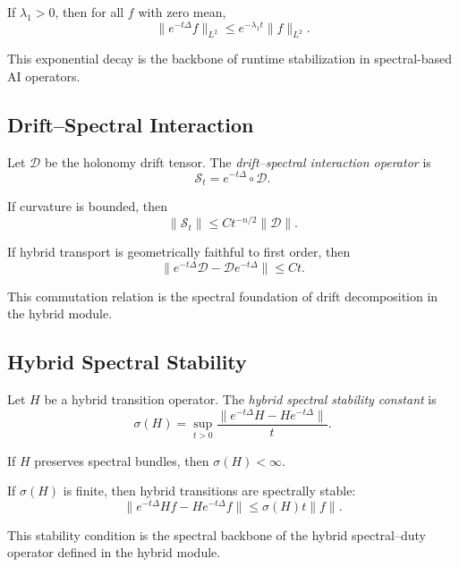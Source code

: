 \begin{theorem}
If $\lambda_1 > 0$, then for all $f$ with zero mean,
\[
\| e^{-t\Delta} f \|_{L^2}
\le e^{-\lambda_1 t} \|f\|_{L^2}.
\]
\]
\end{theorem}

\begin{remark}
This exponential decay is the backbone of runtime stabilization in
spectral-based AI operators.
\end{remark}

\subsection{Drift–Spectral Interaction}

\begin{definition}
Let $\mathcal{D}$ be the holonomy drift tensor.  
The \emph{drift–spectral interaction operator} is
\[
\mathcal{S}_t = e^{-t\Delta} \circ \mathcal{D}.
\]
\end{definition}

\begin{lemma}
If curvature is bounded, then
\[
\| \mathcal{S}_t \|
\le C t^{-n/2} \|\mathcal{D}\|.
\]
\end{lemma}

\begin{theorem}
If hybrid transport is geometrically faithful to first order, then
\[
\| e^{-t\Delta} \mathcal{D} - \mathcal{D} e^{-t\Delta} \|
\le C t.
\]
\end{theorem}

\begin{remark}
This commutation relation is the spectral foundation of drift decomposition
in the hybrid module.
\end{remark}

\subsection{Hybrid Spectral Stability}

\begin{definition}
Let $H$ be a hybrid transition operator.  
The \emph{hybrid spectral stability constant} is
\[
\sigma(H) = \sup_{t > 0}
\frac{\| e^{-t\Delta} H - H e^{-t\Delta} \|}{t}.
\]
\end{definition}

\begin{lemma}
If $H$ preserves spectral bundles, then $\sigma(H) < \infty$.
\end{lemma}

\begin{theorem}
If $\sigma(H)$ is finite, then hybrid transitions are spectrally stable:
\[
\| e^{-t\Delta} H f - H e^{-t\Delta} f \|
\le \sigma(H) t \|f\|.
\]
\end{theorem}

\begin{remark}
This stability condition is the spectral backbone of the hybrid
spectral–duty operator defined in the hybrid module.
\end{remark}
